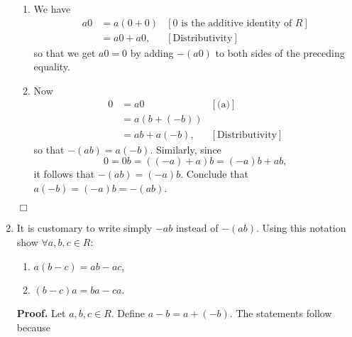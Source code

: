 \documentclass[9pt]{article}
\newcommand{\qed}{\hfill \ensuremath{\Box}}
\begin{document}
\begin{enumerate}
      \begin{enumerate}
         \item We have
               \begin{align*}
                  a0 &= a(0 + 0) &[0 \text{ is the additive identity of }R] \\
                     &= a0 + a0, &[\text{Distributivity}]
               \end{align*}
               so that we get $a0 = 0$ by adding $-(a0)$ to both sides of the
               preceding equality.
         \item Now
               \begin{align*}
                  0 &= a0 &[\text{(a)}]\\
                    &= a(b + (-b)) \\
                     &= ab + a(-b), &[\text{Distributivity}]
               \end{align*}
               so that $-(ab) = a(-b)$. Similarly, since
               $$0 = 0b = ((-a) + a)b = (-a)b + ab,$$
               it follows that $-(ab) = (-a)b$. Conclude that
               $a(-b) = (-a)b = -(ab)$. 
      \end{enumerate} \qed
   \item It is customary to write simply $-ab$ instead of $-(ab)$. Using this
         notation show $\forall a, b, c \in R$:
         \begin{enumerate}
            \item $a(b - c) = ab - ac$,
            \item $(b - c)a = ba - ca.$
         \end{enumerate}
         
      \textbf{Proof.} Let $a, b , c\in R$. Define $a - b = a + (-b)$. The
      statements follow because
      

\end{enumerate}
\end{document}

